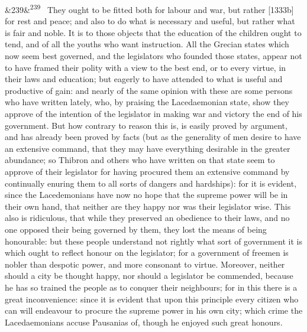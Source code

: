 \documentclass[12pt]{article}
\newcommand{\para}[1][]{\par\noindent\ifx&#1&\else\textsuperscript{\footnotesize #1}~\fi}
\begin{document}
\para[239] They ought to be fitted both for labour and war, but rather [1333b] for rest and peace; and also to do what is necessary and useful, but rather what is fair and noble. It is to those objects that the education of the children ought to tend, and of all the youths who want instruction. All the Grecian states which now seem best governed, and the legislators who founded those states, appear not to have framed their polity with a view to the best end, or to every virtue, in their laws and education; but eagerly to have attended to what is useful and productive of gain: and nearly of the same opinion with these are some persons who have written lately, who, by praising the Lacedaemonian state, show they approve of the intention of the legislator in making war and victory the end of his government. But how contrary to reason this is, is easily proved by argument, and has already been proved by facts (but as the generality of men desire to have an extensive command, that they may have everything desirable in the greater abundance; so Thibron and others who have written on that state seem to approve of their legislator for having procured them an extensive command by continually enuring them to all sorts of dangers and hardships): for it is evident, since the Lacedemonians have now no hope that the supreme power will be in their own hand, that neither are they happy nor was their legislator wise. This also is ridiculous, that while they preserved an obedience to their laws, and no one opposed their being governed by them, they lost the means of being honourable: but these people understand not rightly what sort of government it is which ought to reflect honour on the legislator; for a government of freemen is nobler than despotic power, and more consonant to virtue. Moreover, neither should a city be thought happy, nor should a legislator be commended, because he has so trained the people as to conquer their neighbours; for in this there is a great inconvenience: since it is evident that upon this principle every citizen who can will endeavour to procure the supreme power in his own city; which crime the Lacedaemonians accuse Pausanias of, though he enjoyed such great honours.
\end{document}
